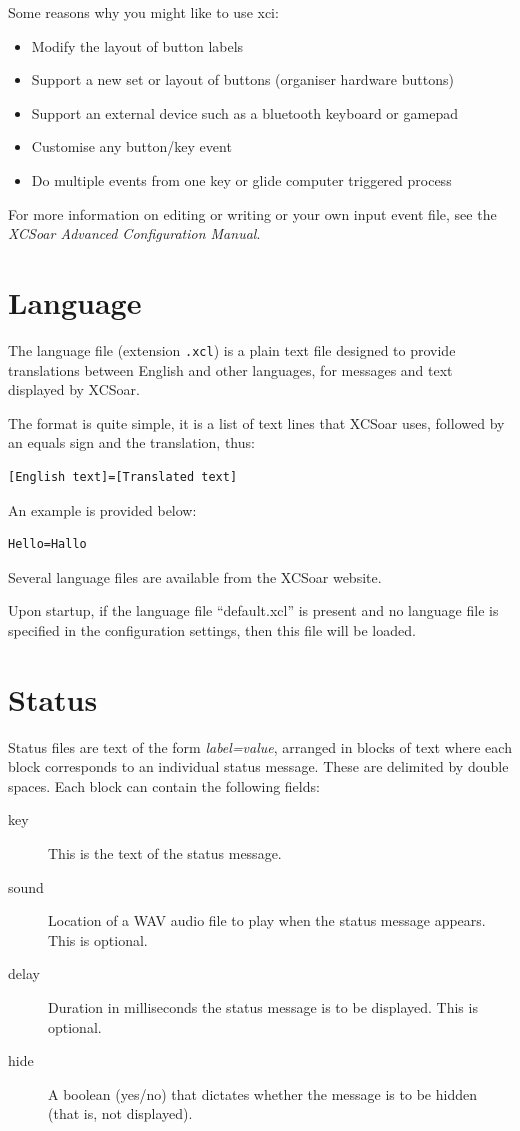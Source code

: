 \documentclass[a4paper,12pt]{refrep}
\begin{document}
Some reasons why you might like to use xci:
\begin{itemize}
\item Modify the layout of button labels
\item Support a new set or layout of buttons (organiser hardware buttons)
\item Support an external device such as a bluetooth keyboard or gamepad
\item Customise any button/key event
\item Do multiple events from one key or glide computer triggered process
\end{itemize}
For more information on editing or writing or your own input event
file, see the {\em XCSoar Advanced Configuration Manual}.

\section{Language}
The language file (extension \verb|.xcl|) is a plain text file
designed to provide translations between English and other languages,
for messages and text displayed by XCSoar.

The format is quite simple, it is a list of text lines that XCSoar uses,
followed by an equals sign and the translation, thus:
\begin{verbatim}
[English text]=[Translated text]
\end{verbatim}

An example is provided below:
\begin{verbatim}
Hello=Hallo
\end{verbatim}

Several language files are available from the XCSoar website.

Upon startup, if the language file ``default.xcl'' is present and no
language file is specified in the configuration settings, then this
file will be loaded.

\section{Status}\label{sec:status}

Status files are text of the form {\em label=value}, arranged in
blocks of text where each block corresponds to an individual status
message.  These are delimited by double spaces.  Each block can
contain the following fields:
\begin{description}
\item[key]  This is the text of the status message.
\item[sound] Location of a WAV audio file to play when the status
  message appears.  This is optional.
\item[delay] Duration in milliseconds the status message is
  to be displayed.  This is optional.
\item[hide] A boolean (yes/no) that dictates whether the message
 is to be hidden (that is, not displayed). 
\end{description} 
\end{document}
